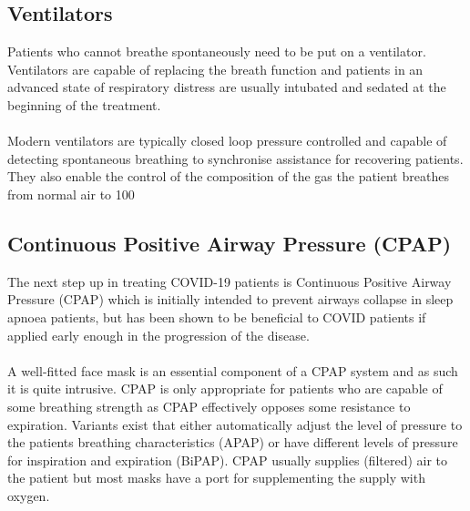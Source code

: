 \documentclass[12pt]{article}
\begin{document}
\subsection{Ventilators}

Patients who cannot breathe spontaneously need to be put on a ventilator. Ventilators are capable of replacing the breath function and patients in an advanced state of respiratory distress are usually intubated and sedated at the beginning of the treatment.
\\
\\
Modern ventilators are typically closed loop pressure controlled and capable of detecting spontaneous breathing to synchronise assistance for recovering patients. They also enable the control of the composition of the gas the patient breathes from normal air to 100%






\subsection{Continuous Positive Airway Pressure (CPAP)}

The next step up in treating COVID-19 patients is Continuous Positive Airway Pressure (CPAP) which is initially intended to prevent airways collapse in sleep apnoea patients, but has been shown to be beneficial to COVID patients if applied early enough in the progression of the disease.
\\
\\
A well-fitted face mask is an essential component of a CPAP system and as such it is quite intrusive. CPAP is only appropriate for patients who are capable of some breathing strength as CPAP effectively opposes some resistance to expiration. Variants exist that either automatically adjust the level of pressure to the patients breathing characteristics (APAP) or have different levels of pressure for inspiration and expiration (BiPAP). CPAP usually supplies (filtered) air to the patient but most masks have a port for supplementing the supply with oxygen.
\end{document}
